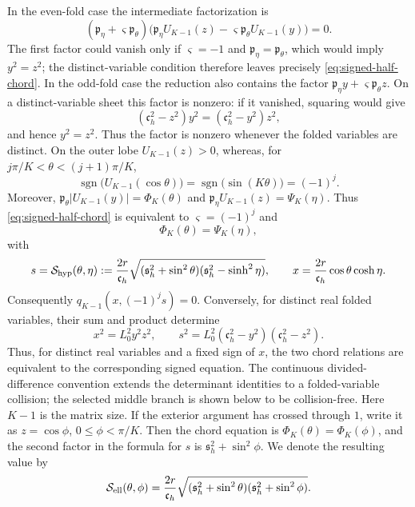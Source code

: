 \documentclass[10pt,twoside]{siamart1116}
\numberwithin{equation}{section}
\begin{document}
In the even-fold case the intermediate factorization is
\[
 (\mathfrak p_\eta+\varsigma\mathfrak p_\theta)
 \bigl(\mathfrak p_\eta U_{K-1}(z)
 -\varsigma\mathfrak p_\theta U_{K-1}(y)\bigr)=0.
\]
The first factor could vanish only if \(\varsigma=-1\) and
\(\mathfrak p_\eta=\mathfrak p_\theta\), which would imply
\(y^2=z^2\); the distinct-variable condition therefore leaves precisely
\eqref{eq:signed-half-chord}.  In the odd-fold case the reduction also
contains the factor
\(\mathfrak p_\eta y+\varsigma\mathfrak p_\theta z\).  On a
distinct-variable sheet this factor is nonzero: if it vanished, squaring
would give
\[
 (\mathfrak c_h^2-z^2)y^2=(\mathfrak c_h^2-y^2)z^2,
\]
and hence \(y^2=z^2\).  Thus the factor is nonzero whenever the folded
variables are distinct.  On the outer lobe
\(U_{K-1}(z)>0\), whereas, for
\(j\pi/K<\theta<(j+1)\pi/K\),
\[
 \operatorname{sgn}\bigl(U_{K-1}(\cos\theta)\bigr)
 =\operatorname{sgn}\bigl(\sin(K\theta)\bigr)=(-1)^j.
\]
Moreover,
\(\mathfrak p_\theta|U_{K-1}(y)|=\Phi_K(\theta)\) and
\(\mathfrak p_\eta U_{K-1}(z)=\Psi_K(\eta)\).  Thus
\eqref{eq:signed-half-chord} is equivalent to
\(\varsigma=(-1)^j\) and
\begin{equation}\label{eq:chord-equation}
 \Phi_K(\theta)=\Psi_K(\eta),
\end{equation}
with
\begin{equation}\label{eq:channel-xs}
 s=\mathcal S_{\rm hyp}(\theta,\eta)
 :=\frac{2r}{\mathfrak c_h}
 \sqrt{(\mathfrak s_h^2+\sin^2\theta)
       (\mathfrak s_h^2-\sinh^2\eta)},\qquad
 x=\frac{2r}{\mathfrak c_h}\cos\theta\cosh\eta.
\end{equation}
Consequently \(q_{K-1}(x,(-1)^j s)=0\).  Conversely, for distinct real
folded variables, their sum and product determine
\[
 x^2=L_0^2y^2z^2,\qquad
 s^2=L_0^2(\mathfrak c_h^2-y^2)(\mathfrak c_h^2-z^2).
\]
Thus, for distinct real variables and a fixed sign of \(x\), the two chord
relations are equivalent to the corresponding signed equation.  The
continuous divided-difference convention extends the determinant identities
to a folded-variable collision; the selected middle branch is shown below to
be collision-free.
Here \(K-1\) is the matrix size.  If the exterior argument has crossed
through \(1\), write it as \(z=\cos\phi\),
\(0\leq\phi<\pi/K\).  Then the chord equation is
\(\Phi_K(\theta)=\Phi_K(\phi)\), and the second factor in the formula
for \(s\) is \(\mathfrak s_h^2+\sin^2\phi\).  We denote the resulting
value by
\[
 \mathcal S_{\rm ell}(\theta,\phi)
 =\frac{2r}{\mathfrak c_h}
 \sqrt{(\mathfrak s_h^2+\sin^2\theta)
       (\mathfrak s_h^2+\sin^2\phi)}.
\]
\end{document}
